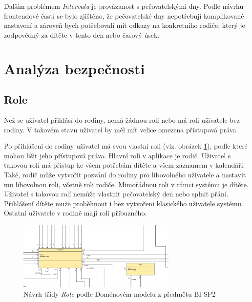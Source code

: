             Dalším problémem \textit{Intervalu} je provázanost s pečovatelskými dny. Podle návrhu frontendové častí se bylo zjištěno, že pečovatelské dny nepotřebují komplikované nastavení a zároveň bych potřebovali mít odkazy na konkretního rodiče, který je zodpovědný za dítěte v tento den nebo časový úsek.
    

    \section{Analýza bezpečnosti}
    
        \subsection{Role}\label{analyza:bezpecnost:role}
    
        Než se uživatel přihlásí do rodiny, nemá žádnou roli nebo má roli uživatele bez rodiny. V takovém stavu uživatel by měl mít velice omezena přístupová práva. 
        
        Po přihlášeni do rodiny uživatel má svou vlastní roli (viz. obrázek \ref{image:Role1}), podle které mohou lišit jeho přístupová práva. Hlavní rolí v aplikace je rodič. Uživatel s takovou rolí má přístup ke všem potřebám dítěte a všem záznamem v kalendáři. Také, rodič může vytvořit pozvání do rodiny pro libovolného uživatele a nastavit mu libovolnou roli, včetně roli rodiče. Mimořádnou roli v rámci systému je dítěte. Uživatel s takovou rolí nemůže vlastnit pečovatelský den nebo splnit přání. Přihlášení dítěte muže proběhnout i bez vytvořeni klasického uživatele systému. Ostatní uživatele v rodině mají roli příbuzného.
        \begin{figure}\centering
	        \includegraphics[width=0.7\textwidth]{pdfs/Role1}
	        \caption[Návrh \textit{Role}]{Návrh třídy \textit{Role} podle Doménovém modelu z předmětu BI-SP2}\label{image:Role1}
        \end{figure}
    
